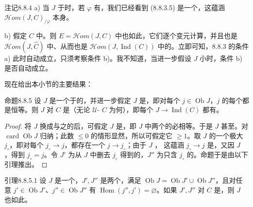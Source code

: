 \begin{SGAresult}{注记}{8.8.4}
 a) 当 $J$ 于时，若 $\varphi$ 有，我们已经看到 (8.8.3.5) 是一个，这蕴涵 $\mathscr{H}\!om(J,C)_{/\varphi}$ 本身。

 b) 假定 $C$ 中。则 $E=\mathscr{H}\!om(J,C)$ 中也如此，它们逐个变元计算，并且也是 $\mathscr{H}\!om(J,\widehat C)$ 中、从而也是 $\mathscr{H}\!om(J,\operatorname{Ind}(C))$ 中的。立即可知，8.8.3 的条件 a) 此时自动成立，只须考察条件 b)。我不知道，当进一步假设 $J$ 小时，条件 b) 是否自动成立。
\end{SGAresult}
现在给出本小节的主要结果：
\begin{SGAresult}{命题}{8.8.5}
设 $J$ 是一个于的，并进一步假定 $J$ 是，即对每个 $j\in\operatorname{Ob}J$，$j$ 的每个都是恒等。则 $J$ 对 $C$ 是（无论 $\mathcal U$- $C$ 为何），即每个 $J\to\operatorname{Ind}(C)$ 都有。
\end{SGAresult}
\begin{proof}
将 $J$ 换成与之的后，可假定 $J$ 是，即 $J$ 中两个的必相等。于是 $J$ 甚至。对 $\operatorname{card}\operatorname{Ob}J$ 归纳；此数 $\leq0$ 的情形显然，所以可假定它 $\geq1$。取 $J$ 的一个极大 $j_\circ$，即对每个 $j_\circ\to j$，都存在一个 $j\to j_\circ$；由于 $J$ ，
这蕴涵 $j_\circ\to j$ 是，又因 $J$ ，得到 $j_\circ=j$。令 $J'$ 为从 $J$ 中删去 $j_\circ$ 得到的，$J''$ 为只含 $j_\circ$ 的。命题于是由以下引理推出。
\end{proof}
\begin{SGAresult}{引理}{8.8.5.1}
设 $J$ 是一个，$J',J''$ 是两个，满足 $\operatorname{Ob}J=\operatorname{Ob}J'\cup\operatorname{Ob}J''$，且对任意 $j'\in\operatorname{Ob}J'$、$j''\in\operatorname{Ob}J''$ 有 $\operatorname{Hom}(j'',j')=\varnothing$。如果 $J',J''$ 对 $C$ 是，则 $J$ 也如此。
\end{SGAresult}
